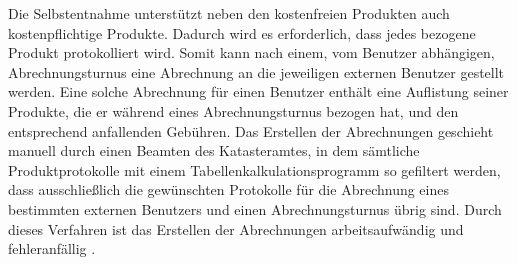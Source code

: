 Die Selbstentnahme unterstützt neben den kostenfreien Produkten auch kostenpflichtige Produkte. Dadurch wird es erforderlich, dass jedes bezogene Produkt protokolliert wird.
Somit kann nach einem, vom Benutzer abhängigen, Abrechnungsturnus eine Abrechnung an die jeweiligen externen Benutzer gestellt werden.
Eine solche Abrechnung für einen Benutzer enthält eine Auflistung seiner Produkte, die er während eines Abrechnungsturnus bezogen hat, und den entsprechend anfallenden Gebühren.
Das Erstellen der Abrechnungen geschieht manuell durch einen Beamten des Katasteramtes, in dem sämtliche Produktprotokolle mit einem Tabellenkalkulationsprogramm so gefiltert werden, dass ausschließlich die gewünschten Protokolle für die Abrechnung eines bestimmten externen Benutzers und einen Abrechnungsturnus übrig sind.
Durch dieses Verfahren ist das Erstellen der Abrechnungen arbeitsaufwändig und fehleranfällig \autocite[vgl.][]{sander-abrechnung}.



